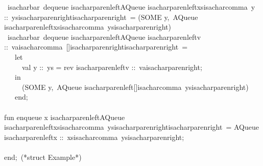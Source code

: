 \begin{isabellebody}
\begin{isamarkuptext}
\hspace*{0pt} ~{}{}isacharbar{}~dequeue {}{}isacharparenleft{}AQueue {}{}isacharparenleft{}xs{}{}isacharcomma{}~y ::~ys{}{}isacharparenright{}{}{}isacharparenright{}~= (SOME y,~AQueue {}{}isacharparenleft{}xs{}{}isacharcomma{}~ys{}{}isacharparenright{})\\
\hspace*{0pt} ~{}{}isacharbar{}~dequeue {}{}isacharparenleft{}AQueue {}{}isacharparenleft{}v ::~va{}{}isacharcomma{}~[]{}{}isacharparenright{}{}{}isacharparenright{}~=\\
\hspace*{0pt} ~~~let\\
\hspace*{0pt} ~~~~~val y ::~ys = rev {}{}isacharparenleft{}v ::~va{}{}isacharparenright{};\\
\hspace*{0pt} ~~~in\\
\hspace*{0pt} ~~~~~(SOME y,~AQueue {}{}isacharparenleft{}[]{}{}isacharcomma{}~ys{}{}isacharparenright{})\\
\hspace*{0pt} ~~~end;\\
\hspace*{0pt}\\
\hspace*{0pt}fun enqueue x {}{}isacharparenleft{}AQueue {}{}isacharparenleft{}xs{}{}isacharcomma{}~ys{}{}isacharparenright{}{}{}isacharparenright{}~= AQueue {}{}isacharparenleft{}x ::~xs{}{}isacharcomma{}~ys{}{}isacharparenright{};\\
\hspace*{0pt}\\
\hspace*{0pt}end;~(*struct Example*)%
\end{isamarkuptext}%
\isamarkuptrue%
%
\endisatagquote
{\isafoldquote}%
%
\isadelimquote

\end{isabellebody}
